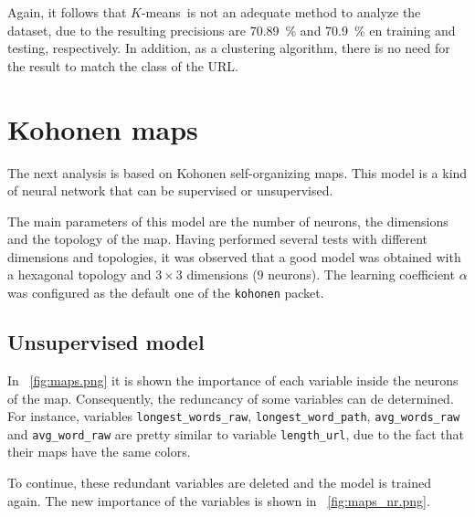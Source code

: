 \documentclass[12pt, a4paper]{article}
\newcommand*{\figref}[1]{\figurename~\ref{fig:#1}}
\newcommand*{\kmeans}{$K$-means}
\begin{document}
      Again, it follows that \kmeans\ is not an adequate method to analyze the dataset, due to the resulting precisions are \SI{70.89}{\percent} and \SI{70.9}{\percent} en training and testing, respectively. In addition, as a clustering algorithm, there is no need for the result to match the class of the URL.

  \section{Kohonen maps}

    The next analysis is based on Kohonen self-organizing maps. This model is a kind of neural network that can be supervised or unsupervised.

    The main parameters of this model are the number of neurons, the dimensions and the topology of the map. Having performed several tests with different dimensions and topologies, it was observed that a good model was obtained with a hexagonal topology and $3 \times 3$ dimensions ($9$ neurons). The learning coefficient $\alpha$ was configured as the default one of the \texttt{kohonen} packet.

    \subsection{Unsupervised model}

      In \figref{maps.png} it is shown the importance of each variable inside the neurons of the map. Consequently, the reduncancy of some variables can de determined. For instance, variables \texttt{longest\_words\_raw}, \texttt{longest\_word\_path}, \texttt{avg\_words\_raw} and \texttt{avg\_word\_raw} are pretty similar to variable \texttt{length\_url}, due to the fact that their maps have the same colors.

      To continue, these redundant variables are deleted and the model is trained again. The new importance of the variables is shown in \figref{maps_nr.png}.
\end{document}
